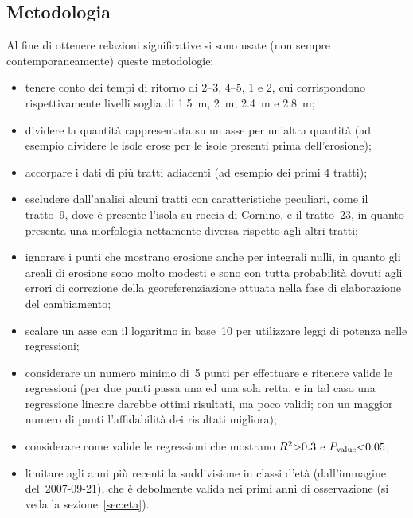 \subsection{Metodologia}
Al fine di ottenere relazioni significative si sono usate (non sempre contemporaneamente) queste metodologie:
%
\begin{itemize}
	\item tenere conto dei tempi di ritorno di \SIrange[range-phrase = {-}, range-units = single]{2}{3}{\mesi}, \SIrange[range-phrase = {-}, range-units = single]{4}{5}{\mesi}, \SI{1}{\anno} e \SI{2}{\anni}, cui corrispondono rispettivamente livelli soglia di \SI{1.5}{\m}, \SI{2}{\m}, \SI{2.4}{\m} e \SI{2.8}{\m};
	\item dividere la quantità rappresentata su un asse per un'altra quantità (ad esempio dividere le isole erose per le isole presenti prima dell'erosione);
	\item accorpare i dati di più tratti adiacenti (ad esempio dei primi 4 tratti);
	\item escludere dall'analisi alcuni tratti con caratteristiche peculiari, come il tratto~9, dove è presente l'isola su roccia di Cornino, e il tratto~23, in quanto presenta una morfologia nettamente diversa rispetto agli altri tratti;
	\item ignorare i punti che mostrano erosione anche per integrali nulli, in quanto gli areali di erosione sono molto modesti e sono con tutta probabilità dovuti agli errori di correzione della georeferenziazione attuata nella fase di elaborazione del cambiamento;
	\item scalare un asse con il logaritmo in base~\num{10} per utilizzare leggi di potenza nelle regressioni;
	\item considerare un numero minimo di~5 punti per effettuare e ritenere valide le regressioni (per due punti passa una ed una sola retta, e in tal caso una regressione lineare darebbe ottimi risultati, ma poco validi; con un maggior numero di punti l'affidabilità dei risultati migliora);
	\item considerare come valide le regressioni che mostrano $R^2 \num{> 0.3}$ e $P_\mathrm{value} \num{< 0.05}$;
	\item limitare agli anni più recenti la suddivisione in classi d'età (dall'immagine del~2007-09-21), che è debolmente valida nei primi anni di osservazione (si veda la sezione~\ref{sec:eta}).
\end{itemize}

